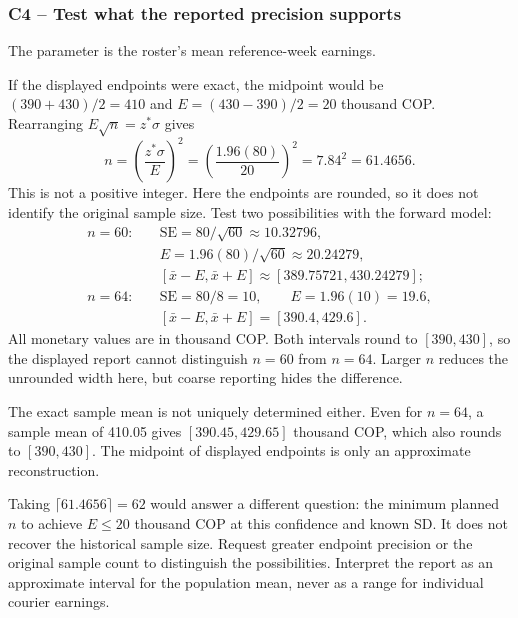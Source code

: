 \subsubsection*{C4 -- Test what the reported precision supports}\label{sol:c4-advanced-2}
The parameter is the roster's mean reference-week earnings. 

If the displayed endpoints were exact, the midpoint would be $(390+430)/2=410$ and $E=(430-390)/2=20$ thousand COP. Rearranging $E\sqrt n=z^*\sigma$ gives
\[
n=\left(\frac{z^*\sigma}{E}\right)^2
=\left(\frac{1.96(80)}{20}\right)^2
=7.84^2=61.4656.
\]
This is not a positive integer. Here the endpoints are rounded, so it does not identify the original sample size. Test two possibilities with the forward model:
\[
\begin{aligned}
n=60:\quad &\mathrm{SE}=80/\sqrt{60}\approx10.32796,\\
&E=1.96(80)/\sqrt{60}\approx20.24279,\\
&[\bar x-E,\bar x+E]\approx[389.75721,430.24279];\\[3pt]
n=64:\quad &\mathrm{SE}=80/8=10,\qquad E=1.96(10)=19.6,\\
&[\bar x-E,\bar x+E]=[390.4,429.6].
\end{aligned}
\]
All monetary values are in thousand COP. Both intervals round to $[390,430]$, so the displayed report cannot distinguish $n=60$ from $n=64$. Larger $n$ reduces the unrounded width here, but coarse reporting hides the difference.

The exact sample mean is not uniquely determined either. Even for $n=64$, a sample mean of 410.05 gives $[390.45,429.65]$ thousand COP, which also rounds to $[390,430]$. The midpoint of displayed endpoints is only an approximate reconstruction.

Taking $\lceil61.4656\rceil=62$ would answer a different question: the minimum planned $n$ to achieve $E\leq20$ thousand COP at this confidence and known SD. It does not recover the historical sample size. Request greater endpoint precision or the original sample count to distinguish the possibilities. Interpret the report as an approximate interval for the population mean, never as a range for individual courier earnings.


